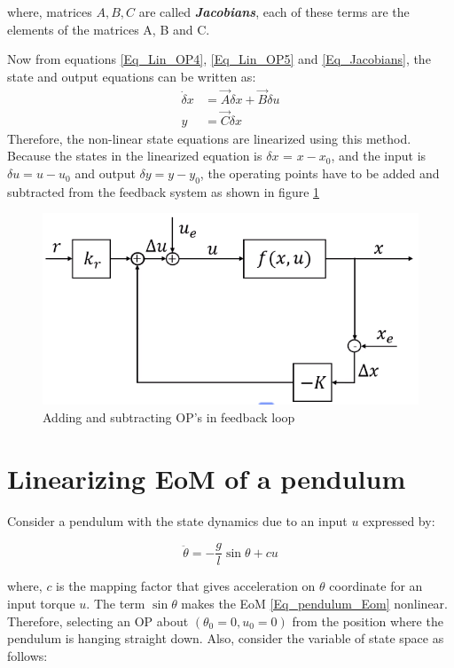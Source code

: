 where, matrices $A,B,C$ are called \textbf{\textit{Jacobians}}, each of these terms are the elements of the matrices A, B and C.

Now from equations \eqref{Eq_Lin_OP4}, \eqref{Eq_Lin_OP5} and \eqref{Eq_Jacobians}, the state and output equations can be written as:
\begin{align}
	\dot{\delta} x &= \vec{A} \delta x + \vec{B} \delta u \\
	y &= \vec{C} \delta x
\end{align}
Therefore, the non-linear state equations are linearized using this method. Because the states in the linearized equation is $\delta x$ = $x - x_0$, and the input is $\delta u = u - u_0$ and output $\delta y = y - y_0$, the operating points have to be added and subtracted from the feedback system as shown in figure \ref{Fig_Lin_OP_FeedBack}
\begin{figure}[h!]
	\centering
	\includegraphics[width=0.65\linewidth]{Bilder/Lin_OP_FeedBack}
	\caption{Adding and subtracting OP's in feedback loop}
	\label{Fig_Lin_OP_FeedBack}
\end{figure}
\newpage

\section{Linearizing EoM of a pendulum}

Consider a pendulum with the state dynamics due to an input $u$ expressed by:

\begin{equation} \label{Eq_pendulum_Eom}
	\ddot{\theta} = -\frac{g}{l}\sin{\theta} + c u
\end{equation}

where, $c$ is the mapping factor that gives acceleration on $\theta$ coordinate for an input torque $u$. The term $\sin{\theta}$ makes the EoM \eqref{Eq_pendulum_Eom} nonlinear. Therefore, selecting an OP about $(\theta_0 = 0, u_0 = 0)$ from the position where the pendulum is hanging straight down. Also, consider the variable of state space as follows:

